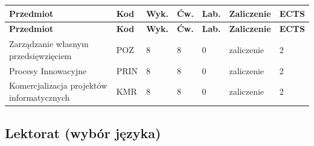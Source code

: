 \documentclass[12pt,a4paper]{article}
\newcommand{\thdrule}{\noalign{\global\setlength{\extrarowheight}{0pt}}}
\newcommand{\thdend}{\noalign{\global\setlength{\extrarowheight}{4pt}}}
\begin{document}
{\scriptsize
\begin{longtable}{m{5.5cm}m{0.8cm}m{1cm}m{1cm}m{1cm}m{1.7cm}m{0.7cm}}
\thdrule\toprule
\rowcolor{pjatkRed}
{\color{white}\footnotesize\textbf{\vphantom{Ag}Przedmiot}} & {\color{white}\footnotesize\textbf{\vphantom{Ag}Kod}} & {\color{white}\footnotesize\textbf{\vphantom{Ag}Wyk.}} & {\color{white}\footnotesize\textbf{\vphantom{Ag}Ćw.}} & {\color{white}\footnotesize\textbf{\vphantom{Ag}Lab.}} & {\color{white}\footnotesize\textbf{\vphantom{Ag}Zaliczenie}} & {\color{white}\footnotesize\textbf{\vphantom{Ag}ECTS}} \\
\midrule\thdend
\endfirsthead
\thdrule\toprule
\rowcolor{pjatkRed}
{\color{white}\footnotesize\textbf{\vphantom{Ag}Przedmiot}} & {\color{white}\footnotesize\textbf{\vphantom{Ag}Kod}} & {\color{white}\footnotesize\textbf{\vphantom{Ag}Wyk.}} & {\color{white}\footnotesize\textbf{\vphantom{Ag}Ćw.}} & {\color{white}\footnotesize\textbf{\vphantom{Ag}Lab.}} & {\color{white}\footnotesize\textbf{\vphantom{Ag}Zaliczenie}} & {\color{white}\footnotesize\textbf{\vphantom{Ag}ECTS}} \\
\midrule\thdend
\endhead
\rowcolor{tableRowLight} Zarządzanie własnym przedsięwzięciem & POZ & 8 & 8 & 0 & {\scriptsize zaliczenie} & 2 \\
\rowcolor{tableRowAlt} Procesy Innowacyjne & PRIN & 8 & 8 & 0 & {\scriptsize zaliczenie} & 2 \\
\rowcolor{tableRowLight} Komercjalizacja projektów informatycznych & KMR & 8 & 8 & 0 & {\scriptsize zaliczenie} & 2 \\
\bottomrule
\end{longtable}}

\subsection*{Lektorat (wybór języka)}
\end{document}
